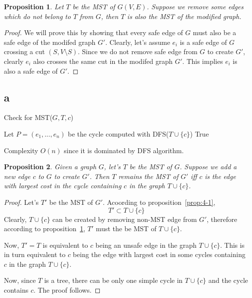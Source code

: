 \documentclass[a4paper,10pt,twoside]{article}
\newtheorem{proof}{Proof}
\newtheorem{proposition}{Proposition}
\begin{document}
\begin{proposition}
\label{prop:4-2}
	Let $T$ be the MST of $G(V, E)$. Suppose we remove some edges which do not belong
	to $T$ from $G$, then $T$ is also the MST of the modified graph.
\end{proposition}
\begin{proof}
	We will prove this by showing that every safe edge of $G$ must also be a safe edge
	of the modifed graph $G'$. Clearly, let's assume $e_i$ is a safe edge of $G$ crossing a cut
	$(S, V\setminus S)$. Since we do not remove safe edge from $G$ to create $G'$, clearly
	$e_i$ also crosses the same cut in the modifed graph $G'$. This implies $e_i$ is also
	a safe edge of $G'$.
\end{proof}


\subsection*{a}

\begin{algorithm}[H]
	\caption{Check for MST($G, T, c$)}
	Let $P=(e_1, ..., e_n)$ be the cycle computed with DFS($T \cup \{c\}$)\;
	{
		\Return True 
	} 

\end{algorithm}

Complexity $O(n)$ since it is dominated by DFS algorithm.

\begin{proposition}
	Given a graph $G$, let's $T$ be the MST of $G$. Suppose we add a new edge
	$c$ to $G$ to create $G'$. Then $T$ remains the MST of $G'$ iff $c$ is the
	edge with largest cost in the cycle containing $c$ in the graph $T\cup \{c\}$.
\end{proposition}
\begin{proof}
	Let's $T'$ be the MST of $G'$. Acoording to proposition~\ref{prop:4-1},
		\[
		 	T' \subset T \cup \{c\}
		 \]
	Clearly, $T\cup \{c\}$ can be created by removing non-MST edge from $G'$, therefore
	according to proposition~\ref{prop:4-2}, $T'$ must the be MST of $T \cup \{c\}$.

	Now, $T' = T$ is equivalent to $c$ being an unsafe edge in the graph $T \cup \{c\}$.
	This is in turn equivalent to $c$ being the
	edge with largest cost in some cycles containing $c$ in the graph $T\cup \{c\}$.

	Now, since $T$ is a tree, there can be only one simple cycle in $T\cup \{c\}$ and 
	the cycle contains $c$. The proof follows.

\end{proof}
\end{document}
